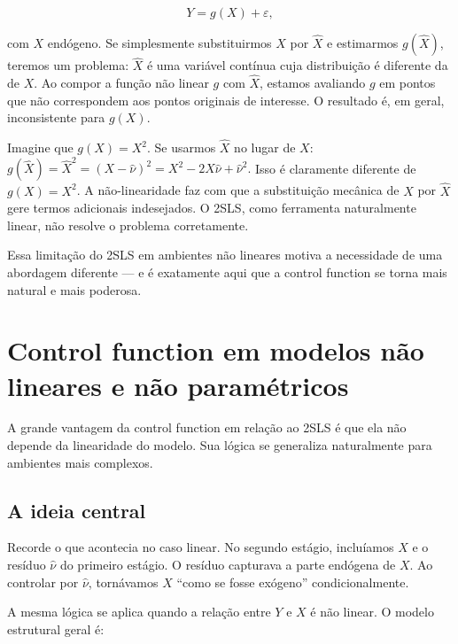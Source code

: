 \begin{equation}
Y = g(X) + \varepsilon,
\end{equation}

\noindent
com $X$ endógeno. Se simplesmente substituirmos $X$ por $\hat{X}$ e estimarmos
$g(\hat{X})$, teremos um problema: $\hat{X}$ é uma variável contínua cuja distribuição
é diferente da de $X$. Ao compor a função não linear $g$ com $\hat{X}$, estamos
avaliando $g$ em pontos que não correspondem aos pontos originais de interesse. O
resultado é, em geral, inconsistente para $g(X)$.

\begin{destacebox}
Imagine que $g(X) = X^2$. Se usarmos $\hat{X}$ no lugar de $X$:
$g(\hat{X}) = \hat{X}^2 = (X - \hat{\nu})^2 = X^2 - 2X\hat{\nu} + \hat{\nu}^2.$
Isso é claramente diferente de $g(X) = X^2$. A não-linearidade faz com que a
substituição mecânica de $X$ por $\hat{X}$ gere termos adicionais indesejados. O
2SLS, como ferramenta naturalmente linear, não resolve o problema corretamente.
\end{destacebox}

Essa limitação do 2SLS em ambientes não lineares motiva a necessidade de uma
abordagem diferente — e é exatamente aqui que a control function se torna mais
natural e mais poderosa.

\chapter{Control function em modelos não lineares e não paramétricos}

A grande vantagem da control function em relação ao 2SLS é que ela não depende da
linearidade do modelo. Sua lógica se generaliza naturalmente para ambientes mais
complexos.

\section*{A ideia central}

Recorde o que acontecia no caso linear. No segundo estágio, incluíamos $X$ e o
resíduo $\hat{\nu}$ do primeiro estágio. O resíduo capturava a parte endógena de $X$.
Ao controlar por $\hat{\nu}$, tornávamos $X$ ``como se fosse exógeno'' condicionalmente.

A mesma lógica se aplica quando a relação entre $Y$ e $X$ é não linear. O modelo
estrutural geral é:

